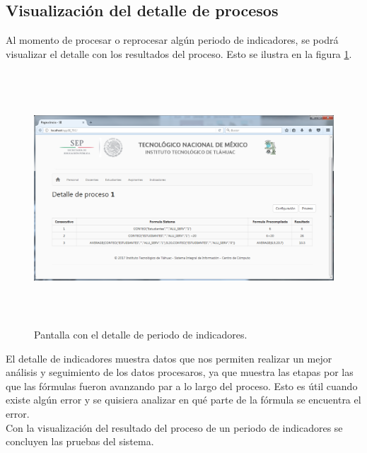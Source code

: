 		    \subsection{Visualizaci\'on del detalle de procesos}

		   Al momento de procesar o reprocesar alg\'un periodo de indicadores, se podr\'a visualizar el detalle con los resultados del proceso. Esto se ilustra en la figura \ref{fig_ProcesoDetalle}.\\

		   \begin{figure}[]
		        \centering
		        \includegraphics[width=16cm, height=9.5cm]{figuras/ProcesoDetalle}
		        \caption{Pantalla con el detalle de periodo de indicadores.}
		        \label{fig_ProcesoDetalle}
		    \end{figure}

		    El detalle de indicadores muestra datos que nos permiten realizar un mejor an\'alisis y seguimiento de los datos procesaros, ya que muestra las etapas por las que las f\'ormulas fueron avanzando par a lo largo del proceso. Esto es \'util cuando existe alg\'un error y se quisiera analizar en qu\'e parte de la f\'ormula se encuentra el error.\\

		    Con la visualizaci\'on del resultado del proceso de un periodo de indicadores se concluyen las pruebas del sistema.\\











